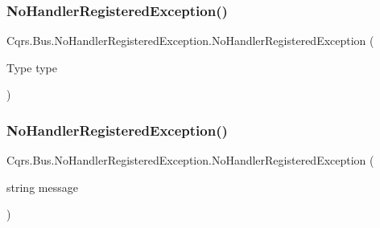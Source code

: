 \subsubsection{\texorpdfstring{No\+Handler\+Registered\+Exception()}{NoHandlerRegisteredException()}\hspace{0.1cm}{\footnotesize\ttfamily [1/2]}}
{\footnotesize\ttfamily Cqrs.\+Bus.\+No\+Handler\+Registered\+Exception.\+No\+Handler\+Registered\+Exception (\begin{DoxyParamCaption}\item[{Type}]{type }\end{DoxyParamCaption})}

\mbox{\label{classCqrs_1_1Bus_1_1NoHandlerRegisteredException_a6f163c9b3fe405f817f97ac8187bf691_a6f163c9b3fe405f817f97ac8187bf691}} 
\subsubsection{\texorpdfstring{No\+Handler\+Registered\+Exception()}{NoHandlerRegisteredException()}\hspace{0.1cm}{\footnotesize\ttfamily [2/2]}}
{\footnotesize\ttfamily Cqrs.\+Bus.\+No\+Handler\+Registered\+Exception.\+No\+Handler\+Registered\+Exception (\begin{DoxyParamCaption}\item[{string}]{message }\end{DoxyParamCaption})}

